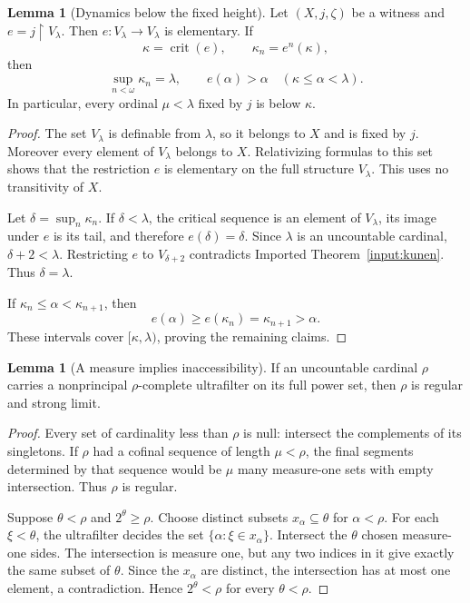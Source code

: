 \documentclass[11pt,letterpaper]{article}
\theoremstyle{definition}
\newtheorem{lemma}[definition]{Lemma}
\newcommand{\crit}{\operatorname{crit}}
\newcommand{\restr}{\mathbin{\upharpoonright}}
\begin{document}
\begin{lemma}[Dynamics below the fixed height]\label{lem:dynamics}
Let $(X,j,\zeta)$ be a witness and $e=j\restr V_\lambda$. Then $e:V_\lambda\to V_\lambda$ is elementary. If
\[
 \kappa=\crit(e),\qquad \kappa_n=e^n(\kappa),
\]
then
\[
 \sup_{n<\omega}\kappa_n=\lambda,
 \qquad e(\alpha)>\alpha\quad(\kappa\le\alpha<\lambda).
\]
In particular, every ordinal $\mu<\lambda$ fixed by $j$ is below $\kappa$.
\end{lemma}

\begin{proof}
The set $V_\lambda$ is definable from $\lambda$, so it belongs to $X$ and is fixed by $j$. Moreover every element of $V_\lambda$ belongs to $X$. Relativizing formulas to this set shows that the restriction $e$ is elementary on the full structure $V_\lambda$. This uses no transitivity of $X$.

Let $\delta=\sup_n\kappa_n$. If $\delta<\lambda$, the critical sequence is an element of $V_\lambda$, its image under $e$ is its tail, and therefore $e(\delta)=\delta$. Since $\lambda$ is an uncountable cardinal, $\delta+2<\lambda$. Restricting $e$ to $V_{\delta+2}$ contradicts Imported Theorem~\ref{input:kunen}. Thus $\delta=\lambda$.

If $\kappa_n\le\alpha<\kappa_{n+1}$, then
\[
                  e(\alpha)\ge e(\kappa_n)=\kappa_{n+1}>\alpha.
\]
These intervals cover $[\kappa,\lambda)$, proving the remaining claims.
\end{proof}

\begin{lemma}[A measure implies inaccessibility]\label{lem:inaccessible}
If an uncountable cardinal $\rho$ carries a nonprincipal $\rho$-complete ultrafilter on its full power set, then $\rho$ is regular and strong limit.
\end{lemma}

\begin{proof}
Every set of cardinality less than $\rho$ is null: intersect the complements of its singletons. If $\rho$ had a cofinal sequence of length $\mu<\rho$, the final segments determined by that sequence would be $\mu$ many measure-one sets with empty intersection. Thus $\rho$ is regular.

Suppose $\theta<\rho$ and $2^\theta\ge\rho$. Choose distinct subsets $x_\alpha\subseteq\theta$ for $\alpha<\rho$. For each $\xi<\theta$, the ultrafilter decides the set $\{\alpha:\xi\in x_\alpha\}$. Intersect the $\theta$ chosen measure-one sides. The intersection is measure one, but any two indices in it give exactly the same subset of $\theta$. Since the $x_\alpha$ are distinct, the intersection has at most one element, a contradiction. Hence $2^\theta<\rho$ for every $\theta<\rho$.
\end{proof}
\end{document}
